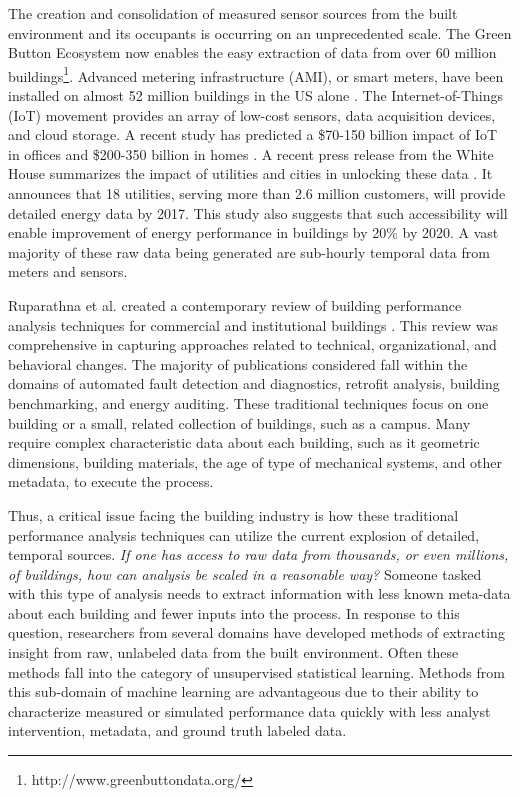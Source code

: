 The creation and consolidation of measured sensor sources from the built environment and its occupants is occurring on an unprecedented scale. The Green Button Ecosystem now enables the easy extraction of data from over 60 million buildings\footnote{http://www.greenbuttondata.org/}. Advanced metering infrastructure (AMI), or smart meters, have been installed on almost 52 million buildings in the US alone \cite{energy_information_administration_how_2015}. The Internet-of-Things (IoT) movement provides an array of low-cost sensors, data acquisition devices, and cloud storage. A recent study has predicted a \$70-150 billion impact of IoT in offices and \$200-350 billion in homes \cite{james_manyika_unlocking_2015}. A recent press release from the White House summarizes the impact of utilities and cities in unlocking these data \cite{_fact_2016}. It announces that 18 utilities, serving more than 2.6 million customers, will provide detailed energy data by 2017. This study also suggests that such accessibility will enable improvement of energy performance in buildings by 20\% by 2020. A vast majority of these raw data being generated are sub-hourly temporal data from meters and sensors.

Ruparathna et al. created a contemporary review of building performance analysis techniques for commercial and institutional buildings \cite{ruparathna_improving_2016}. This review was comprehensive in capturing approaches related to technical, organizational, and behavioral changes. The majority of publications considered fall within the domains of automated fault detection and diagnostics, retrofit analysis, building benchmarking, and energy auditing. These traditional techniques focus on one building or a small, related collection of buildings, such as a campus. Many require complex characteristic data about each building, such as it geometric dimensions, building materials, the age of type of mechanical systems, and other metadata, to execute the process. 

Thus, a critical issue facing the building industry is how these traditional performance analysis techniques can utilize the current explosion of detailed, temporal sources. \emph{If one has access to raw data from thousands, or even millions, of buildings, how can analysis be scaled in a reasonable way?} Someone tasked with this type of analysis needs to extract information with less known meta-data about each building and fewer inputs into the process. In response to this question, researchers from several domains have developed methods of extracting insight from raw, unlabeled data from the built environment. Often these methods fall into the category of unsupervised statistical learning. Methods from this sub-domain of machine learning are advantageous due to their ability to characterize measured or simulated performance data quickly with less analyst intervention, metadata, and ground truth labeled data. 